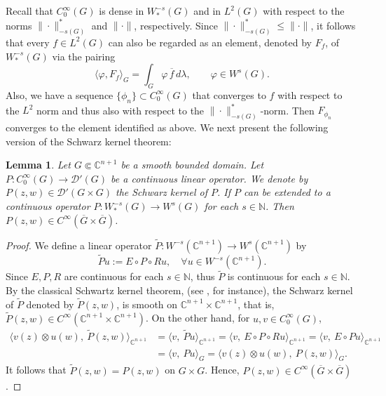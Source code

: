 \documentclass[a4paper,centertags,oneside,12pt]{amsart}
\newtheorem{lemma}[theorem]{Lemma}
\numberwithin{equation}{section}
\begin{document}
Recall that \(C_0^\infty(G)\) is dense in \(W_\ast^{-s}(G)\) and in \(L^2(G)\) with respect to the norms \(\|\cdot\|_{-s(G)}^\ast\) and \(\|\cdot\|\), respectively. Since  \(\|\cdot\|_{-s(G)}^\ast \leq \|\cdot\|\), it follows that every \(f \in L^2(G)\) can also be regarded as an element, denoted by $F_f$, of \(W_{\ast}^{-s}(G)\) via the pairing
\begin{equation*}
    \langle \varphi, F_f \rangle_G =\int_{G} \varphi \, \overline{f} \, d\lambda, \qquad \varphi \in W^s(G).
\end{equation*}
Also, we have a sequence $\{\phi_n\}\subset C^\infty_0(G)$ that converges to $f$ with respect to the $L^2$ norm and thus also with respect to the $\|\cdot\|^*_{-s(G)}$-norm.
Then $F_{\phi_n}$ converges to the element identified as above.  We next present the following version of the Schwarz kernel theorem:


\begin{lemma}\label{Boundary regularity}
    Let $G\Subset\mathbb C^{n+1}$ be a smooth bounded domain.  Let $P: C_0^\infty(G)\rightarrow \mathcal D'(G)$ be a continuous linear operator. We denote by $P(z, w)\in\mathcal D'(G\times G)$ the Schwarz kernel of $P$. If $P$ can be extended to a continuous operator $P: W^{-s}_\ast(G)\rightarrow W^s(G)$ for each $s\in\mathbb N$. Then $P(z, w)\in C^\infty(\overline G\times\overline G)$.
\end{lemma}
\begin{proof}
    We define a  linear operator  $\tilde P: W^{-s}(\mathbb C^{n+1})\rightarrow W^s(\mathbb C^{n+1})$ by
    \begin{equation*}
        \tilde Pu:= E\circ P\circ Ru, \quad\forall u\in W^{-s}(\mathbb C^{n+1}).
    \end{equation*}
    Since $E, P, R$ are continuous for each $s\in\mathbb N$, thus $\tilde P$ is continuous for each $s\in\mathbb N$. By the classical Schwartz kernel theorem, (see \cite{H90}, for instance), the Schwarz kernel of $\tilde P$ denoted by $\tilde P(z, w)$, is smooth on $\mathbb C^{n+1}\times\mathbb C^{n+1}$, that is, $\tilde P(z,w)\in C^\infty(\mathbb C^{n+1}\times\mathbb C^{n+1})$. On the other hand, for $u, v\in C_0^\infty(G)$,
    \begin{equation*}
    \begin{split}
       \langle  v(z)\otimes u(w), ~\tilde P(z, w)\rangle_{\mathbb C^{n+1}}
       &= \langle v,~\tilde Pu\rangle_{\mathbb C^{n+1}}=\langle v,~ E\circ P\circ Ru\rangle_{\mathbb C^{n+1}}=\langle v,~E\circ P u\rangle_{\mathbb C^{n+1}}\\
       &=\langle v,~Pu\rangle_G=\langle v(z)\otimes u(w),  ~P(z, w)\rangle_G.
       \end{split}
    \end{equation*}
    It follows that $\tilde P(z, w)=P(z, w)$ on $G\times G$. Hence, $P(z, w)\in C^\infty(\overline G\times\overline G)$.
\end{proof}
\end{document}
